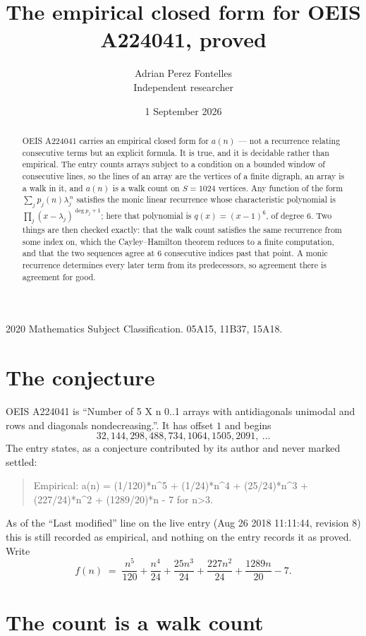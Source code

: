 \documentclass[11pt,a4paper]{article}
\title{The empirical closed form for OEIS A224041, proved}
\author{Adrian Perez Fontelles\\ \small Independent researcher}
\date{1 September 2026}
\theoremstyle{plain}
\theoremstyle{definition}
\begin{document}
\maketitle

\begin{abstract}
OEIS A224041 carries an empirical closed form for $a(n)$ --- not a recurrence relating
consecutive terms but an explicit formula. It is true, and it is decidable rather than
empirical. The entry counts arrays subject to a condition on a bounded window of consecutive lines, so the lines of an array are the
vertices of a finite digraph, an array is a walk in it, and $a(n)$ is a walk count on
$S=1024$ vertices. Any function of the form $\sum_j p_j(n)\lambda_j^{\,n}$ satisfies the
monic linear recurrence whose characteristic polynomial is
$\prod_j(x-\lambda_j)^{\deg p_j+1}$; here that polynomial is $q(x)=(x-1)^{6}$, of degree
$6$. Two things are then checked exactly: that the walk count satisfies the same
recurrence from some index on, which the Cayley--Hamilton theorem reduces to a finite
computation, and that the two sequences agree at $6$ consecutive indices past that
point. A monic recurrence determines every later term from its predecessors, so agreement
there is agreement for good.
\end{abstract}

\noindent\small 2020 Mathematics Subject Classification. 05A15, 11B37, 15A18.\normalsize

\section{The conjecture}

OEIS A224041 is ``Number of 5 X n 0..1 arrays with antidiagonals unimodal and rows and diagonals nondecreasing.''. It has offset $1$ and begins
\[
32, 144, 298, 488, 734, 1064, 1505, 2091,\ \dots
\]
The entry states, as a conjecture contributed by its author and never marked settled:
\begin{quote}
Empirical: a(n) = (1/120)*n\^{}5 + (1/24)*n\^{}4 + (25/24)*n\^{}3 + (227/24)*n\^{}2 + (1289/20)*n - 7 for n>3.
\end{quote}
As of the ``Last modified'' line on the live entry (Aug 26 2018 11:11:44, revision 8) this is still
recorded as empirical, and nothing on the entry records it as proved. Write
\[
f(n)\;=\;\frac{n^{5}}{120} + \frac{n^{4}}{24} + \frac{25 n^{3}}{24} + \frac{227 n^{2}}{24} + \frac{1289 n}{20} - 7.
\]

\section{The count is a walk count}
\end{document}
